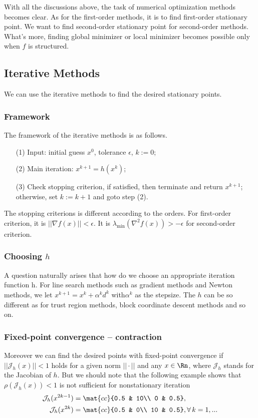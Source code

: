 With all the discussions above, the task of numerical optimization methods becomes clear. 
As for the first-order methods, it is to find first-order stationary point.
We want to find second-order stationary point for second-order methods. What's more, finding global minimizer or local minimizer becomes possible only when $f$ is structured. 
	


\subsection{Iterative Methods}
We can use the iterative methods to find the desired stationary points.

	\subsubsection{Framework}
The framework of the iterative methods is as follows.
	\begin{itemize}
		\item[(1)] Input: initial guess $x^0$, tolerance $\epsilon$, $k:=0$;
		\item[(2)] Main iteration: $x^{k+1} = h(x^k)$;
		\item[(3)] Check stopping criterion, if satisfied, then terminate and return $x^{k+1}$;
		otherwise, set $k:=k+1$ and goto step (2).
	\end{itemize}
The stopping criterions is different according to the orders.
For first-order criterion, it is $||\nabla f(x)||<\epsilon$.
It is $\lambda_{\min}(\nabla^2 f(x))>-\epsilon$ for second-order criterion.

	


	\subsubsection{Choosing $h$}
A question naturally arises that how do we choose an appropriate iteration function h.
For line search methods such as gradient methods and Newton methods, we let $x^{k+1} = x^k + \alpha^k d^k$ with$\alpha^k$ as the stepsize.
The $h$ can be so different as for trust region methods, block coordinate descent methods and so on.
	
	\subsubsection{Fixed-point convergence -- contraction}
Moreover we can find the desired points with fixed-point convergence if $||\mathcal{J}_h(x)||<1$ holds for a given norm $||\cdot||$ and any $x\in\Rn$, where $\mathcal{J}_h$ stands for the Jacobian of $h$. 
But we should note that the following example shows that $\rho\left(\mathcal{J}_h(x)\right)<1$ is not sufficient for nonstationary iteration
\begin{eqnarray*}
	\small \mathcal{J}_h(x^{2k-1}) &=\mat{cc}{0.5 & 10\\ 0 & 0.5},
\\	\mathcal{J}_h(x^{2k}) &=\mat{cc}{0.5 & 0\\ 10 & 0.5},  \forall\, k=1, ...
\end{eqnarray*}


